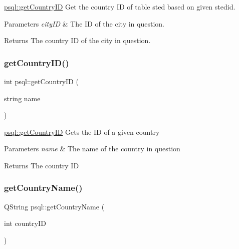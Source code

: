 \mbox{\hyperlink{classpsql_a81d02dc0350ba11d90257914078ba432}{psql\+::get\+Country\+ID}} Get the country ID of table sted based on given stedid. 


\begin{DoxyParams}{Parameters}
{\em city\+ID} & The ID of the city in question. \\
\hline
\end{DoxyParams}
\begin{DoxyReturn}{Returns}
The country ID of the city in question. 
\end{DoxyReturn}
\mbox{\label{classpsql_a9a7069491b2a8d6c986339a13619ef6a}} 
\subsubsection{\texorpdfstring{getCountryID()}{getCountryID()}\hspace{0.1cm}{\footnotesize\ttfamily [2/2]}}
{\footnotesize\ttfamily int psql\+::get\+Country\+ID (\begin{DoxyParamCaption}\item[{string}]{name }\end{DoxyParamCaption})}



\mbox{\hyperlink{classpsql_a81d02dc0350ba11d90257914078ba432}{psql\+::get\+Country\+ID}} Gets the ID of a given country 


\begin{DoxyParams}{Parameters}
{\em name} & The name of the country in question \\
\hline
\end{DoxyParams}
\begin{DoxyReturn}{Returns}
The country ID 
\end{DoxyReturn}
\mbox{\label{classpsql_a5724e9992e6a5c98524ab73b98f4202d}} 
\subsubsection{\texorpdfstring{getCountryName()}{getCountryName()}}
{\footnotesize\ttfamily Q\+String psql\+::get\+Country\+Name (\begin{DoxyParamCaption}\item[{int}]{country\+ID }\end{DoxyParamCaption})}



